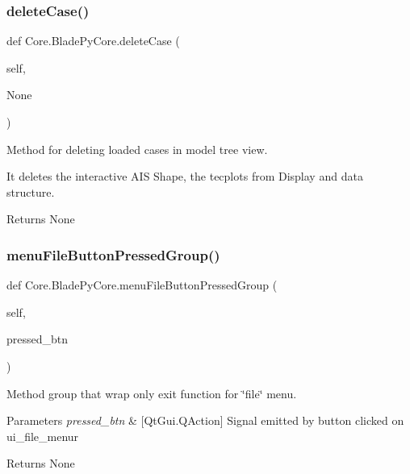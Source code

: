 \subsubsection{\texorpdfstring{delete\+Case()}{deleteCase()}}
{\footnotesize\ttfamily def Core.\+Blade\+Py\+Core.\+delete\+Case (\begin{DoxyParamCaption}\item[{}]{self,  }\item[{}]{None }\end{DoxyParamCaption})}



Method for deleting loaded cases in model tree view. 

It deletes the interactive A\+IS Shape, the tecplots from Display and data structure.

\begin{DoxyReturn}{Returns}
None 
\end{DoxyReturn}
\hypertarget{a00078_aedcbcf23c32b9661d48f28e11c0c7172}{}\label{a00078_aedcbcf23c32b9661d48f28e11c0c7172} 
\subsubsection{\texorpdfstring{menu\+File\+Button\+Pressed\+Group()}{menuFileButtonPressedGroup()}}
{\footnotesize\ttfamily def Core.\+Blade\+Py\+Core.\+menu\+File\+Button\+Pressed\+Group (\begin{DoxyParamCaption}\item[{}]{self,  }\item[{}]{pressed\+\_\+btn }\end{DoxyParamCaption})}



Method group that wrap only exit function for \char`\"{}file\char`\"{} menu. 


\begin{DoxyParams}{Parameters}
{\em pressed\+\_\+btn} & \mbox{[}Qt\+Gui.\+Q\+Action\mbox{]} Signal emitted by button clicked on ui\+\_\+file\+\_\+menur \\
\hline
\end{DoxyParams}
\begin{DoxyReturn}{Returns}
None 
\end{DoxyReturn}
\hypertarget{a00078_ac45b825bd62e01689fb2987a0a2d850a}{}\label{a00078_ac45b825bd62e01689fb2987a0a2d850a} 
